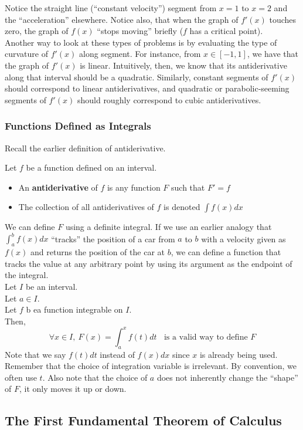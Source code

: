 \documentclass[10pt]{article}
\newenvironment{definition}[1][]{\begin{tcolorbox}[colframe=_orange,colback=_orange2,title=Definition. \ifthenelse{\isempty{#1}}{}{(#1)}
]}{\end{tcolorbox}}
\newcommand{\emptyline}[0]{\\\hfill$~$\\}
\begin{document}
Notice the straight line (``constant velocity'') segment from $x=1$ to $x=2$ and the ``acceleration'' elsewhere. Notice also, that when the graph of $f'(x)$ touches zero, the graph of $f(x)$ ``stops moving'' briefly ($f$ has a critical point).
\emptyline
Another way to look at these types of problems is by evaluating the type of curvature of $f'(x)$ along segment. For instance, from $x\in[-1,1]$, we have that the graph of $f'(x)$ is linear. Intuitively, then, we know that its antiderivative along that interval should be a quadratic. Similarly, constant segments of $f'(x)$ should correspond to linear antiderivatives, and quadratic or parabolic-seeming segments of $f'(x)$ should roughly correspond to cubic antiderivatives.
\subsubsection{Functions Defined as Integrals}
Recall the earlier definition of antiderivative.
\begin{definition}
    Let $f$ be a function defined on an interval.
    \begin{itemize}
        \item An \textbf{antiderivative} of $f$ is any function $F$ such that $F'=f$
        \item The collection of all antiderivatives of $f$ is denoted $\displaystyle\int f(x)dx$
    \end{itemize}
\end{definition}
We can define $F$ using a definite integral. If we use an earlier analogy that $\displaystyle\int_a^bf(x)dx$ ``tracks'' the position of a car from $a$ to $b$ with a velocity given as $f(x)$ and returns the position of the car at $b$, we can define a function that tracks the value at any arbitrary point by using its argument as the endpoint of the integral.
\emptyline
Let $I$ be an interval. \\
Let $a\in I$. \\
Let $f$ b ea function integrable on $I$. \\
Then,
$$
    \forall x\in I,~F(x)=\int_a^x f(t)dt~~~~\text{is a valid way to define $F$}
$$
Note that we say $f(t)dt$ instead of $f(x)dx$ since $x$ is already being used. Remember that the choice of integration variable is irrelevant. By convention, we often use $t$. Also note that the choice of $a$ does not inherently change the ``shape'' of $F$, it only moves it up or down.
\subsection{The First Fundamental Theorem of Calculus}
\end{document}
